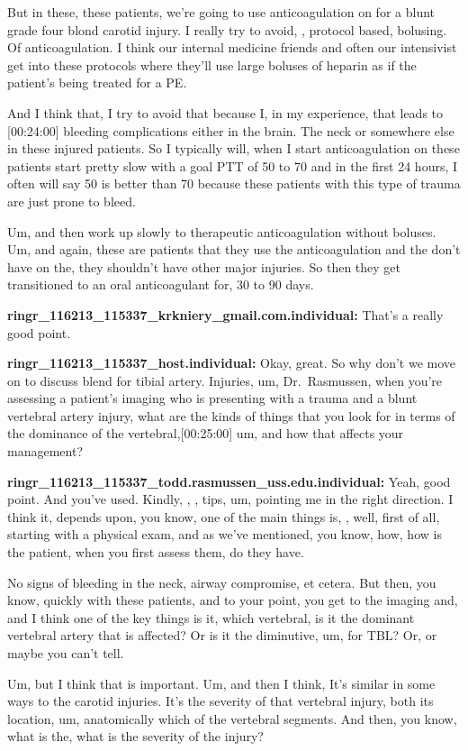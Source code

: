 \documentclass[
]{book}
\begin{document}
But in these, these patients, we're going to use anticoagulation on for
a blunt grade four blond carotid injury. I really try to avoid, ,
protocol based, bolusing. Of anticoagulation. I think our internal
medicine friends and often our intensivist get into these protocols
where they'll use large boluses of heparin as if the patient's being
treated for a PE.

And I think that, I try to avoid that because I, in my experience, that
leads to {[}00:24:00{]} bleeding complications either in the brain. The neck
or somewhere else in these injured patients. So I typically will, when I
start anticoagulation on these patients start pretty slow with a goal
PTT of 50 to 70 and in the first 24 hours, I often will say 50 is better
than 70 because these patients with this type of trauma are just prone
to bleed.

Um, and then work up slowly to therapeutic anticoagulation without
boluses. Um, and again, these are patients that they use the
anticoagulation and the don't have on the, they shouldn't have other
major injuries. So then they get transitioned to an oral anticoagulant
for, 30 to 90 days.

\textbf{ringr\_116213\_115337\_krkniery\_gmail.com.individual:} That's a really
good point.

\textbf{ringr\_116213\_115337\_host.individual:} Okay, great. So why don't we
move on to discuss blend for tibial artery. Injuries, um, Dr.~Rasmussen,
when you're assessing a patient's imaging who is presenting with a
trauma and a blunt vertebral artery injury, what are the kinds of things
that you look for in terms of the dominance of the vertebral,{[}00:25:00{]}
um, and how that affects your management?

\textbf{ringr\_116213\_115337\_todd.rasmussen\_uss.edu.individual:} Yeah, good
point. And you've used. Kindly, , , tips, um, pointing me in the right
direction. I think it, depends upon, you know, one of the main things
is, , well, first of all, starting with a physical exam, and as we've
mentioned, you know, how, how is the patient, when you first assess
them, do they have.

No signs of bleeding in the neck, airway compromise, et cetera. But
then, you know, quickly with these patients, and to your point, you get
to the imaging and, and I think one of the key things is it, which
vertebral, is it the dominant vertebral artery that is affected? Or is
it the diminutive, um, for TBL? Or, or maybe you can't tell.

Um, but I think that is important. Um, and then I think, It's similar in
some ways to the carotid injuries. It's the severity of that vertebral
injury, both its location, um, anatomically which of the vertebral
segments. And then, you know, what is the, what is the severity of the
injury?
\end{document}
